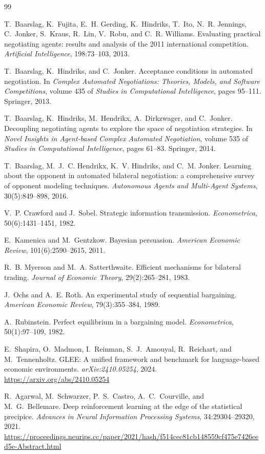 \documentclass{article}
\begin{document}
\clearpage

\begin{thebibliography}{99}\small

T.~Baarslag, K.~Fujita, E.~H. Gerding, K.~Hindriks, T.~Ito, N.~R. Jennings,
C.~Jonker, S.~Kraus, R.~Lin, V.~Robu, and C.~R. Williams.
Evaluating practical negotiating agents: results and analysis of the 2011
international competition.
\emph{Artificial Intelligence}, 198:73--103, 2013.

T.~Baarslag, K.~Hindriks, and C.~Jonker. Acceptance conditions in automated
negotiation. In \emph{Complex Automated Negotiations: Theories, Models, and
Software Competitions}, volume 435 of \emph{Studies in Computational
Intelligence}, pages 95--111. Springer, 2013.

T.~Baarslag, K.~Hindriks, M.~Hendrikx, A.~Dirkzwager, and C.~Jonker.
Decoupling negotiating agents to explore the space of negotiation strategies.
In \emph{Novel Insights in Agent-based Complex Automated Negotiation}, volume
535 of \emph{Studies in Computational Intelligence}, pages 61--83. Springer,
2014.

T.~Baarslag, M.~J.~C. Hendrikx, K.~V. Hindriks, and C.~M. Jonker.
Learning about the opponent in automated bilateral negotiation: a comprehensive
survey of opponent modeling techniques.
\emph{Autonomous Agents and Multi-Agent Systems}, 30(5):849--898, 2016.

V.~P. Crawford and J.~Sobel. Strategic information transmission.
\emph{Econometrica}, 50(6):1431--1451, 1982.

E.~Kamenica and M.~Gentzkow. Bayesian persuasion.
\emph{American Economic Review}, 101(6):2590--2615, 2011.

R.~B. Myerson and M.~A. Satterthwaite. Efficient mechanisms for bilateral trading.
\emph{Journal of Economic Theory}, 29(2):265--281, 1983.

J.~Ochs and A.~E. Roth. An experimental study of sequential bargaining.
\emph{American Economic Review}, 79(3):355--384, 1989.

A.~Rubinstein. Perfect equilibrium in a bargaining model.
\emph{Econometrica}, 50(1):97--109, 1982.

E.~Shapira, O.~Madmon, I.~Reinman, S.~J.~Amouyal, R.~Reichart, and M.~Tennenholtz.
GLEE: A unified framework and benchmark for language-based economic environments.
\emph{arXiv:2410.05254}, 2024. \url{https://arxiv.org/abs/2410.05254}

R.~Agarwal, M.~Schwarzer, P.~S.~Castro, A.~C.~Courville, and M.~G.~Bellemare.
Deep reinforcement learning at the edge of the statistical precipice.
\emph{Advances in Neural Information Processing Systems}, 34:29304--29320, 2021.
\url{https://proceedings.neurips.cc/paper/2021/hash/f514cec81cb148559cf475e7426eed5e-Abstract.html}
\end{thebibliography}
\end{document}
